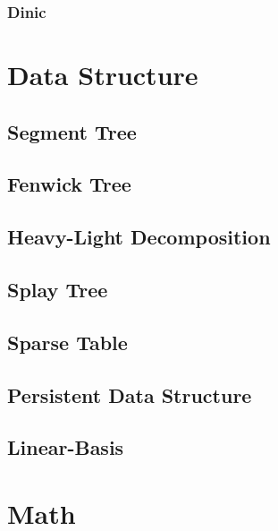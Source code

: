 \documentclass[a4paper]{article}
\begin{document}


\subsubsection{Dinic}



\pagebreak

\section{Data Structure}

\subsection{Segment Tree}

\subsection{Fenwick Tree}

\subsection{Heavy-Light Decomposition}

\subsection{Splay Tree}

\subsection{Sparse Table}

\subsection{Persistent Data Structure}

\subsection{Linear-Basis}



\pagebreak

\section{Math}
\end{document}
